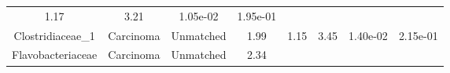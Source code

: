 \documentclass[12pt,]{article}
\begin{document}
\begin{longtable}[]{@{}cccccccc@{}}
\begin{minipage}[t]{0.14\columnwidth}
1.17\strut
\end{minipage} & \begin{minipage}[t]{0.14\columnwidth}\centering\strut
3.21\strut
\end{minipage} & \begin{minipage}[t]{0.06\columnwidth}\centering\strut
1.05e-02\strut
\end{minipage} & \begin{minipage}[t]{0.06\columnwidth}\centering\strut
1.95e-01\strut
\end{minipage}\tabularnewline
\begin{minipage}[t]{0.18\columnwidth}\centering\strut
Clostridiaceae\_1\strut
\end{minipage} & \begin{minipage}[t]{0.07\columnwidth}\centering\strut
Carcinoma\strut
\end{minipage} & \begin{minipage}[t]{0.09\columnwidth}\centering\strut
Unmatched\strut
\end{minipage} & \begin{minipage}[t]{0.03\columnwidth}\centering\strut
1.99\strut
\end{minipage} & \begin{minipage}[t]{0.14\columnwidth}\centering\strut
1.15\strut
\end{minipage} & \begin{minipage}[t]{0.14\columnwidth}\centering\strut
3.45\strut
\end{minipage} & \begin{minipage}[t]{0.06\columnwidth}\centering\strut
1.40e-02\strut
\end{minipage} & \begin{minipage}[t]{0.06\columnwidth}\centering\strut
2.15e-01\strut
\end{minipage}\tabularnewline
\begin{minipage}[t]{0.18\columnwidth}\centering\strut
Flavobacteriaceae\strut
\end{minipage} & \begin{minipage}[t]{0.07\columnwidth}\centering\strut
Carcinoma\strut
\end{minipage} & \begin{minipage}[t]{0.09\columnwidth}\centering\strut
Unmatched\strut
\end{minipage} & \begin{minipage}[t]{0.03\columnwidth}\centering\strut
2.34\strut
\end{minipage} & \begin{minipage}[t]{0.14\columnwidth}\centering\strut

\end{minipage}
\end{longtable}
\end{document}
